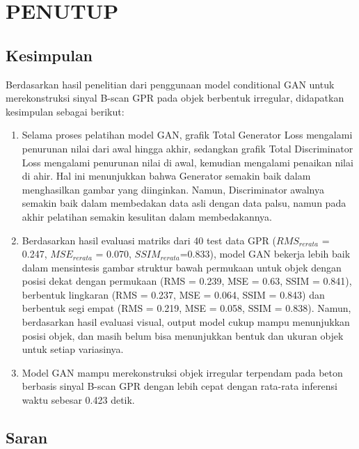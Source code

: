 \chapter{PENUTUP}
\label{chap:penutup}


\section{Kesimpulan}
\label{sec:kesimpulan}

Berdasarkan hasil penelitian dari penggunaan model conditional GAN untuk merekonstruksi sinyal B-scan GPR pada objek berbentuk irregular, didapatkan kesimpulan sebagai berikut:

\begin{enumerate}[nolistsep]

  \item Selama proses pelatihan model GAN, grafik Total Generator Loss mengalami penurunan nilai dari awal hingga akhir, sedangkan grafik Total Discriminator Loss mengalami penurunan nilai di awal, kemudian mengalami penaikan nilai di ahir. 
  Hal ini menunjukkan bahwa Generator semakin baik dalam menghasilkan gambar yang diinginkan. Namun, Discriminator awalnya semakin baik dalam membedakan data asli dengan data palsu, namun pada akhir pelatihan semakin kesulitan dalam membedakannya.

  \item Berdasarkan hasil evaluasi matriks dari 40 test data GPR ($RMS_{rerata}$ = 0.247, $MSE_{rerata}$ = 0.070, $SSIM_{rerata}$=0.833), model GAN bekerja lebih baik dalam mensintesis gambar struktur bawah permukaan untuk objek dengan posisi dekat dengan permukaan (RMS = 0.239, MSE = 0.63, SSIM = 0.841), berbentuk lingkaran (RMS = 0.237, MSE = 0.064, SSIM = 0.843) dan berbentuk segi empat (RMS = 0.219, MSE = 0.058, SSIM = 0.838).
  Namun, berdasarkan hasil evaluasi visual, output model cukup mampu menunjukkan posisi objek, dan masih belum bisa menunjukkan bentuk dan ukuran objek untuk setiap variasinya.

  \item Model GAN mampu  merekonstruksi objek irregular terpendam pada beton berbasis sinyal B-scan GPR dengan lebih cepat dengan rata-rata inferensi waktu sebesar 0.423 detik.
\end{enumerate}

\section{Saran}
\label{chap:saran}


